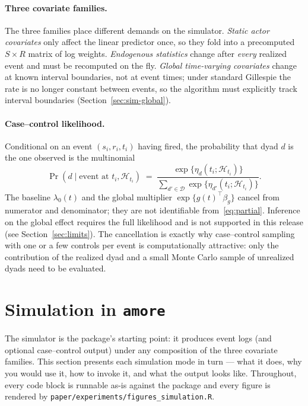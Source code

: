 \documentclass[11pt,a4paper]{article}
\begin{document}
\paragraph{Three covariate families.}
The three families place different demands on the simulator.
\emph{Static actor covariates} only affect the linear predictor
once, so they fold into a precomputed $S \times R$ matrix of log
weights.  \emph{Endogenous statistics} change after \emph{every}
realized event and must be recomputed on the fly.  \emph{Global
time-varying covariates} change at known interval boundaries, not at
event times; under standard Gillespie the rate is no longer constant
between events, so the algorithm must explicitly track interval
boundaries (Section~\ref{sec:sim-global}).

\paragraph{Case--control likelihood.}
Conditional on an event $(s_i, r_i, t_i)$ having fired, the
probability that dyad $d$ is the one observed is the multinomial
\begin{equation}
\Pr(d \mid \text{event at } t_i, \mathcal{H}_{t_i}) \;=\;
\frac{\exp\bigl\{\eta_d(t_i; \mathcal{H}_{t_i})\bigr\}}
     {\sum_{d' \in \mathcal{D}}
        \exp\bigl\{\eta_{d'}(t_i; \mathcal{H}_{t_i})\bigr\}}.
\label{eq:partial}
\end{equation}
The baseline $\lambda_0(t)$ and the global multiplier
$\exp\{g(t)^\top \beta_g\}$ cancel from numerator and denominator;
they are not identifiable from~\eqref{eq:partial}.  Inference on the
global effect requires the full likelihood and is not supported in
this release (see Section~\ref{sec:limits}).  The cancellation is
exactly why case--control sampling with one or a few controls per
event is computationally attractive: only the contribution of the
realized dyad and a small Monte Carlo sample of unrealized dyads
need to be evaluated.

\section{Simulation in \texttt{amore}}\label{sec:simulation}

The simulator is the package's starting point: it produces event
logs (and optional case--control output) under any composition of
the three covariate families.  This section presents each
simulation mode in turn --- what it does, why you would use it,
how to invoke it, and what the output looks like.  Throughout,
every code block is runnable as-is against the package and every
figure is rendered by
\texttt{paper/experiments/figures\_simulation.R}.
\end{document}
